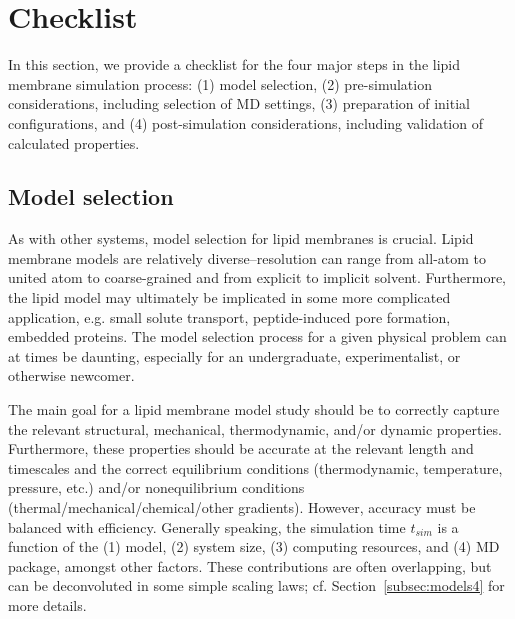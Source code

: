 \documentclass[9pt,bestpractices,pubversion]{livecoms}
\begin{document}
\section{Checklist}
\label{sec:checklist}
In this section, we provide a checklist for the four major steps in the lipid membrane simulation process: (1) model selection, (2) pre-simulation considerations, including selection of MD settings, (3) preparation of initial configurations, and (4) post-simulation considerations, including validation of calculated properties.

\subsection{Model selection}
\label{subsec:models3}
As with other systems, model selection for lipid membranes is crucial.
Lipid membrane models are relatively diverse--resolution can range from all-atom to united atom to coarse-grained and from explicit to implicit solvent.
Furthermore, the lipid model may ultimately be implicated in some more complicated application, e.g. small solute transport, peptide-induced pore formation, embedded proteins.
The model selection process for a given physical problem can at times be daunting, especially for an undergraduate, experimentalist, or otherwise newcomer.

The main goal for a lipid membrane model study should be to correctly capture the relevant structural, mechanical, thermodynamic, and/or dynamic properties.
Furthermore, these properties should be accurate at the relevant length and timescales and the correct equilibrium conditions (thermodynamic, temperature, pressure, etc.) and/or nonequilibrium conditions (thermal/mechanical/chemical/other gradients).
However, accuracy must be balanced with efficiency.
Generally speaking, the simulation time $t_{sim}$ is a function of the (1) model, (2) system size, (3) computing resources, and (4) MD package, amongst other factors.
These contributions are often overlapping, but can be deconvoluted in some simple scaling laws; cf. Section~\ref{subsec:models4} for more details.
\end{document}
